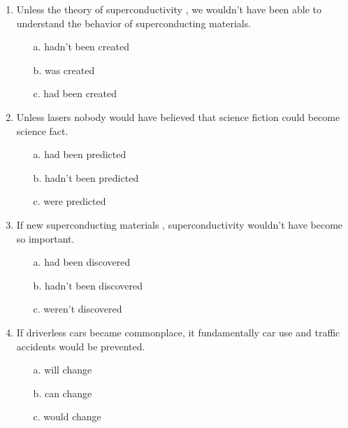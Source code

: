 \begin{enumerate}
      \item Unless the theory of superconductivity \underline{\hspace{2cm}}, we wouldn’t have been able to understand the behavior of superconducting materials.
            \begin{enumerate}
                  \item[a.] hadn’t been created
                  \item[b.] was created
                  \item[c.] had been created
            \end{enumerate}

      \item Unless lasers \underline{\hspace{2cm}} nobody would have believed that science fiction could become science fact.
            \begin{enumerate}
                  \item[a.] had been predicted
                  \item[b.] hadn’t been predicted
                  \item[c.] were predicted
            \end{enumerate}

      \item If new superconducting materials \underline{\hspace{2cm}}, superconductivity wouldn’t have become so important.
            \begin{enumerate}
                  \item[a.] had been discovered
                  \item[b.] hadn’t been discovered
                  \item[c.] weren’t discovered
            \end{enumerate}

      \item If driverless cars became commonplace, it \underline{\hspace{2cm}} fundamentally \underline{\hspace{2cm}} car use and traffic accidents would be prevented.
            \begin{enumerate}
                  \item[a.] will change
                  \item[b.] can change
                  \item[c.] would change
            \end{enumerate}


\end{enumerate}

